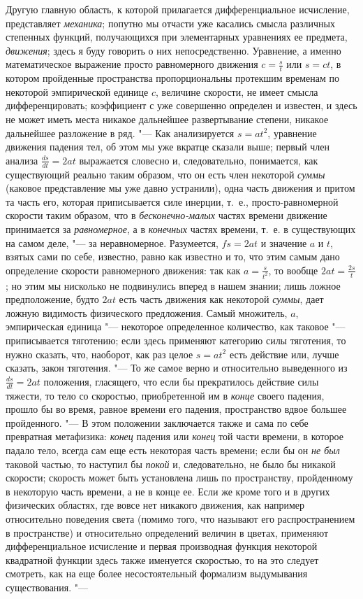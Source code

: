 Другую главную область, к которой прилагается дифференциальное исчисление,
представляет {\em механика}; попутно мы отчасти уже
касались смысла различных степенных функций, получающихся при элементарных
уравнениях ее предмета, {\em движения}; здесь я буду
говорить о них непосредственно. Уравнение, а именно математическое
выражение просто равномерного движения $c=\frac s t$ или $s=ct$,
в котором пройденные пространства пропорциональны протекшим временам по
некоторой эмпирической единице $c$, величине
скорости, не имеет смысла дифференцировать; коэффициент с уже совершенно
определен и известен, и здесь не может иметь места никакое дальнейшее
развертывание степени, никакое дальнейшее разложение в ряд. "--- Как
анализируется $s=at^2$, уравнение движения падения тел, об этом мы уже
вкратце сказали выше; первый член анализа
$\frac{ds}{dt}=2at$ выражается словесно и,
следовательно, понимается, как существующий реально таким образом, что он
есть член некоторой {\em суммы} (каковое представление
мы уже давно устранили), одна часть движения и притом та часть его, которая
приписывается силе инерции, т.~е., просто-равномерной скорости таким
образом, что в {\em бесконечно-малых} частях времени
движение принимается за {\em равномерное}, а в
{\em конечных} частях времени, т.~е. в существующих на
самом деле, "--- за неравномерное. Разумеется, $fs=2at$ и
значение $a$ и $t$, взятых
сами по себе, известно, равно как известно и то, что этим самым дано
определение скорости равномерного движения: так как $a=\frac s{t^2}$, то
вообще $2at=\frac{2s} t$; но этим мы нисколько не подвинулись
вперед в нашем знании; лишь ложное предположение, будто $2at$
есть часть движения как некоторой {\em суммы}, дает
ложную видимость физического предложения. Самый множитель,
$a$, эмпирическая единица "--- некоторое определенное
количество, как таковое "--- приписывается тяготению; если здесь применяют
категорию силы тяготения, то нужно сказать, что, наоборот, как раз целое
$s=at^2$ есть действие или, лучше сказать, закон тяготения. "--- То же самое
верно и относительно выведенного из
$\frac{ds}{dt}=2at$ положения, гласящего, что
если бы прекратилось действие силы тяжести, то тело со скоростью,
приобретенной им в {\em конце} своего падения, прошло
бы во время, равное времени его падения, пространство вдвое большее
пройденного. "--- В этом положении заключается также и сама по себе превратная
метафизика: {\em конец} падения или
{\em конец} той части времени, в которое падало тело,
всегда сам еще есть некоторая часть времени; если бы он
{\em не был} таковой частью, то наступил бы
{\em покой} и, следовательно, не было бы никакой
скорости; скорость может быть установлена лишь по пространству, пройденному
в некоторую часть времени, а не в конце ее. Если же кроме того и в других
физических областях, где вовсе нет никакого движения, как например
относительно поведения света (помимо того, что называют его
распространением в пространстве) и относительно определений величин в
цветах, применяют дифференциальное исчисление и первая производная функция
некоторой квадратной функции здесь также именуется скоростью, то на это
следует смотреть, как на еще более несостоятельный формализм выдумывания
существования. "---

